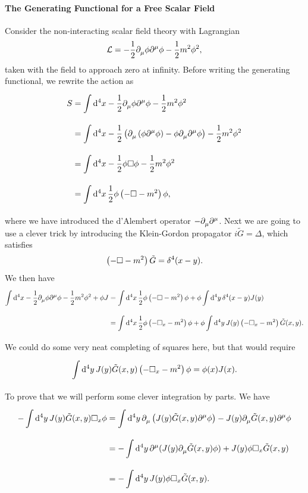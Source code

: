 \paragraph{The Generating Functional for a Free Scalar Field}
Consider the non-interacting scalar field theory with Lagrangian
\begin{align*}
	\mathcal{L} = -\frac{1}{2}\partial^{}_{\mu}\phi\partial^{\mu}_{}\phi - \frac{1}{2}m^{2}\phi^{2},
\end{align*}
taken with the field to approach zero at infinity. Before writing the generating functional, we rewrite the action as
\begin{align*}
	S &= \int\limits_{}^{}\dd[4]{x}-\frac{1}{2}\partial^{}_{\mu}\phi\partial^{\mu}_{}\phi - \frac{1}{2}m^{2}\phi^{2} \\
	  &= \int\limits_{}^{}\dd[4]{x}-\frac{1}{2}\left(\partial^{}_{\mu}\left(\phi\partial^{\mu}_{}\phi\right) - \phi\partial^{}_{\mu}\partial^{\mu}_{}\phi\right) - \frac{1}{2}m^{2}\phi^{2} \\
	  &= \int\limits_{}^{}\dd[4]{x}-\frac{1}{2}\phi\square\phi - \frac{1}{2}m^{2}\phi^{2} \\
	  &= \int\limits_{}^{}\dd[4]{x}\frac{1}{2}\phi\left(-\square - m^{2}\right)\phi,
\end{align*}
where we have introduced the d'Alembert operator $-\partial^{}_{\mu}\partial^{\mu}_{}$. Next we are going to use a clever trick by introducing the Klein-Gordon propagator $i\tilde{G} = \Delta$, which satisfies
\begin{align*}
	\left(-\square - m^{2}\right)\tilde{G} = \delta^{4}(x - y).
\end{align*}
We then have
\begin{align*}
	\int\limits_{}^{}\dd[4]{x}-\frac{1}{2}\partial^{}_{\mu}\phi\partial^{\mu}_{}\phi - \frac{1}{2}m^{2}\phi^{2} + \phi J &= \int\limits_{}^{}\dd[4]{x}\frac{1}{2}\phi\left(-\square - m^{2}\right)\phi + \phi\int\limits_{}^{}\dd[4]{y}\delta^{4}(x - y)J(y) \\
	&= \int\limits_{}^{}\dd[4]{x}\frac{1}{2}\phi\left(-\square_{x} - m^{2}\right)\phi + \phi\int\limits_{}^{}\dd[4]{y}J(y)\left(-\square_{x} - m^{2}\right)\tilde{G}(x, y).
\end{align*}
We could do some very neat completing of squares here, but that would require
\begin{align*}
	\int\limits_{}^{}\dd[4]{y}J(y)\tilde{G}(x, y)\left(-\square_{x} - m^{2}\right)\phi = \phi(x)J(x).
\end{align*}
To prove that we will perform some clever integration by parts. We have
\begin{align*}
	-\int\limits_{}^{}\dd[4]{y}J(y)\tilde{G}(x, y)\square_{x}\phi &= \int\limits_{}^{}\dd[4]{y}\partial^{}_{\mu}\left(J(y)\tilde{G}(x, y)\partial^{\mu}_{}\phi\right) - J(y)\partial^{}_{\mu}\tilde{G}(x, y)\partial^{\mu}_{}\phi \\
	&= -\int\limits_{}^{}\dd[4]{y}\partial^{\mu}_{}(J(y)\partial^{}_{\mu}\tilde{G}(x, y)\phi) + J(y)\phi\square_{x}\tilde{G}(x, y) \\
	&= -\int\limits_{}^{}\dd[4]{y}J(y)\phi\square_{x}\tilde{G}(x, y).
\end{align*}
